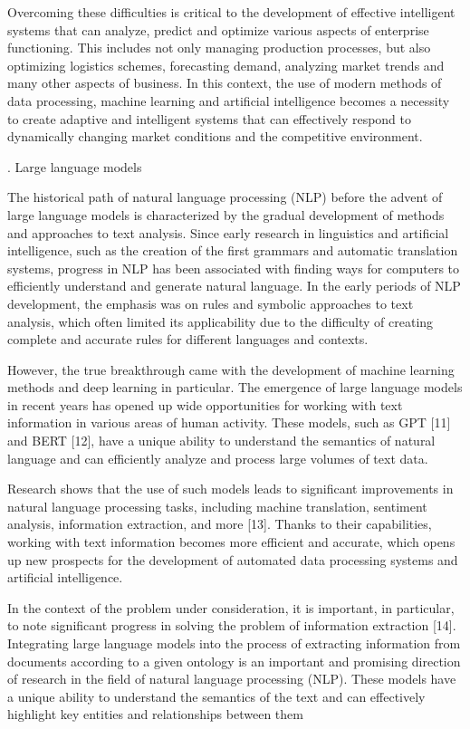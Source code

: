 \documentclass{article}
\begin{document}
\begin{SCn}
\begin{multicols}
Overcoming these difficulties is critical to the development of effective intelligent systems that can analyze, predict and optimize various aspects of enterprise
functioning. This includes not only managing production processes, but also optimizing logistics schemes,
forecasting demand, analyzing market trends and many
other aspects of business. In this context, the use of
modern methods of data processing, machine learning
and artificial intelligence becomes a necessity to create
adaptive and intelligent systems that can effectively respond to dynamically changing market conditions and
the competitive environment.
\begin{center}
    {\MakeUppercase{.}}
    Large language models
\end{center}

The historical path of natural language processing
(NLP) before the advent of large language models is
characterized by the gradual development of methods
and approaches to text analysis. Since early research in
linguistics and artificial intelligence, such as the creation
of the first grammars and automatic translation systems,
progress in NLP has been associated with finding ways
for computers to efficiently understand and generate natural language. In the early periods of NLP development,
the emphasis was on rules and symbolic approaches to
text analysis, which often limited its applicability due to
the difficulty of creating complete and accurate rules for
different languages and contexts.

However, the true breakthrough came with the development of machine learning methods and deep learning
in particular. The emergence of large language models
in recent years has opened up wide opportunities for
working with text information in various areas of human
activity. These models, such as GPT [11] and BERT
[12], have a unique ability to understand the semantics of
natural language and can efficiently analyze and process
large volumes of text data.

Research shows that the use of such models leads to
significant improvements in natural language processing
tasks, including machine translation, sentiment analysis,
information extraction, and more [13]. Thanks to their capabilities, working with text information becomes more
efficient and accurate, which opens up new prospects for
the development of automated data processing systems
and artificial intelligence.

In the context of the problem under consideration, it
is important, in particular, to note significant progress
in solving the problem of information extraction [14].
Integrating large language models into the process of
extracting information from documents according to a
given ontology is an important and promising direction
of research in the field of natural language processing
(NLP). These models have a unique ability to understand
the semantics of the text and can effectively highlight key
entities and relationships between them


\end{multicols}
\end{SCn}
\end{document}
